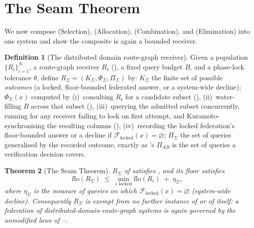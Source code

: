 \documentclass[11pt,twocolumn,a4paper]{article}
\theoremstyle{rdm}
\newtheorem{theorem}{Theorem}[section]
\theoremstyle{definition}
\newtheorem{definition}[theorem]{Definition}
\theoremstyle{remark}
\newcommand{\Know}{K}
\newcommand{\flo}{\mathrm{flo}}
\newcommand{\Rec}{R}
\newcommand{\Fed}{\mathcal{F}}
\newcommand{\rg}{\mathfrak{r}}
\begin{document}
\section{The Seam Theorem}
\label{sec:seam}

We now compose  (Selection),
 (Allocation), 
(Combination), and  (Elimination)
into one system and show the composite is again a bounded receiver.

\begin{definition}[The distributed domain route-graph receiver]
\label{def:seam-receiver}
Given a population $\{\Rec_i\}_{i=1}^N$, a route-graph receiver $\Rec_\rg$
(), a fixed query budget $B$, and a phase-lock
tolerance $\theta$, define $\Rec_\Sigma=(\Know_\Sigma,\Phi_\Sigma,\Pi_\Sigma)$
by: $\Know_\Sigma$ the finite set of possible \emph{outcomes} (a locked,
floor-bounded federated answer, or a system-wide decline); $\Phi_\Sigma(x)$
computed by (i)~consulting $\Rec_\rg$ for a candidate subset
(), (ii)~water-filling $B$ across that subset
(), (iii)~querying the admitted subset
concurrently, running  for any receiver failing to
lock on first attempt, and Kuramoto-synchronising the resulting columns
(), (iv)~recording the locked federation's
floor-bounded answer or a decline if $\Fed_{\mathrm{locked}}(x)=\varnothing$;
$\Pi_\Sigma$ the set of queries generalised by the recorded outcome, exactly
as \citet[Def.~9.1]{sachikonye-accountable-compilation}'s
$\Pi_{AB}$ is the set of queries a verification decision covers.
\end{definition}

\begin{theorem}[The Seam Theorem]
\label{thm:seam}
$\Rec_\Sigma$ of  satisfies
, and its floor satisfies
\[
\flo(\Rec_\Sigma)
\;\le\;
\min_{i\text{ locked}}\flo(\Rec_i) \;+\; \eta_\Sigma,
\]
where $\eta_\Sigma$ is the measure of queries on which
$\Fed_{\mathrm{locked}}(x)=\varnothing$ (system-wide decline). Consequently
$\Rec_\Sigma$ is exempt from no further instance of
or of  itself: a federation of
distributed-domain-route-graph systems is again governed by the unmodified
laws of --.
\end{theorem}
\end{document}

